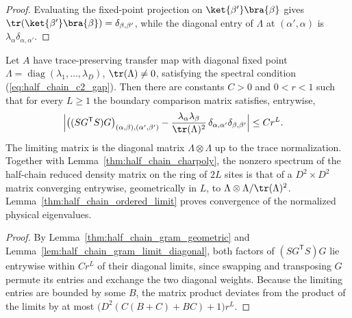 \begin{proof}
    \leanok
    Evaluating the fixed-point projection on $\ket{\beta'}\bra{\beta}$ gives
    $\tr(\ket{\beta'}\bra{\beta})=\delta_{\beta,\beta'}$, while the diagonal entry
    of $\Lambda$ at $(\alpha',\alpha)$ is $\lambda_\alpha\delta_{\alpha,\alpha'}$.
\end{proof}

\begin{lemma}%
    \label{thm:half_chain_comparison_geometric}
    \leanok
    Let $A$ have trace-preserving transfer map with diagonal fixed point
    $\Lambda=\operatorname{diag}(\lambda_1,\ldots,\lambda_D)$,
    $\tr(\Lambda)\neq0$, satisfying the spectral condition
    (\ref{eq:half_chain_c2_gap}). Then there are constants $C>0$ and $0<r<1$
    such that for every $L\geq1$ the boundary comparison matrix satisfies,
    entrywise,
    \begin{align}
        \Bigl|
        \bigl((SG^{\mathsf T}S)G\bigr)_{(\alpha,\beta),(\alpha',\beta')}
        -\frac{\lambda_\alpha\lambda_\beta}{\tr(\Lambda)^2}\,
        \delta_{\alpha,\alpha'}\delta_{\beta,\beta'}
        \Bigr|
         & \leq C r^{L}.
        \label{eq:half_chain_comparison_geometric}
    \end{align}
    The limiting matrix is the diagonal matrix $\Lambda\otimes\Lambda$ up to
    the trace normalization. Together with
    Lemma~\ref{thm:half_chain_charpoly}, the nonzero spectrum of the
    half-chain reduced density matrix on the ring of $2L$ sites is that of a
    $D^2\times D^2$ matrix converging entrywise, geometrically in $L$, to
    $\Lambda\otimes\Lambda/\tr(\Lambda)^2$. Lemma~\ref{thm:half_chain_ordered_limit}
    proves convergence of the normalized physical eigenvalues.
\end{lemma}

\begin{proof}
    \leanok
    By Lemma~\ref{thm:half_chain_gram_geometric} and
    Lemma~\ref{lem:half_chain_gram_limit_diagonal}, both factors of
    $(SG^{\mathsf T}S)G$ lie entrywise within $Cr^{L}$ of their diagonal
    limits, since swapping and transposing $G$ permute its entries and exchange
    the two diagonal weights. Because the limiting entries are bounded by some
    $B$, the matrix product deviates from the product of the limits by at most
    $\bigl(D^2(C(B+C)+BC)+1\bigr)r^{L}$.
\end{proof}

